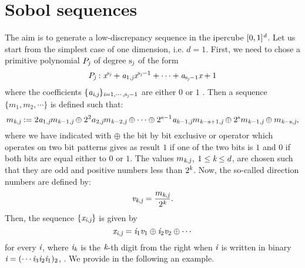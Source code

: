 \section{Sobol sequences}
The aim is to generate a low-discrepancy sequence in the ipercube $[0,1]^{\textit{d}}$. 
Let us start from the simplest case of one dimension, i.e. $d=1$. First, we need to chose a primitive polynomial $P_{\textit{j}}$ of degree $\textrm{s}_{\textit{j}}$ of the form
\begin{equation}
P_{\textit{j}}:\textit{x}^{\textrm{s}_{\textit{j}}}+\textit{a}_{1, \textit{j}}\textit{x}^{\textrm{s}_{\textit{j}}-1}+\cdots+\textit{a}_{\textrm{s}_{\textit{j}}-1}\textit{x}+1
\end{equation}
where the coefficients $\{\textit{a}_{\textit{i},\textit{j}}\}_{\textit{i}= 1, \cdots, \textrm{s}_{\textit{j}}-1}$ are either $0$ or $1$ \cite{joe2008constructing}. 
Then a sequence $\{m_1,m_2,\cdots\}$ is defined such that:
\begin{equation}\label{eq:m}
m_{\textit{k}, \textit{j}} := 2\textit{a}_{1, \textit{j}}m_{\textit{k}-1, \textit{j}}\oplus 2^2a_{2, \textit{j}}m_{\textit{k}-2, \textit{j}}\oplus \cdots \oplus 2^{\textrm{s}-1}\textit{a}_{\textit{k}-1, \textit{j}}m_{\textit{k}-\textrm{s}+1, \textit{j}}\oplus 2^{\textrm{s}}m_{\textit{k}-1, \textit{j}}\oplus m_{\textit{k}-\textrm{s}, \textit{j}},
\end{equation}
where we have indicated with $\oplus$ the bit by bit exclusive or operator which operates on two bit patterns gives as result $1$ if one of the two bits is $1$ and $0$ if both bits are equal either to $0$ or $1$. The values $m_{\textit{k}, \textit{j}}$, $1\leq\textit{k}\leq d$, are chosen such that they are odd and positive numbers less than $2^{\textit{k}}$. Now, the so-called direction numbers are defined by:
\begin{equation}\label{eq:dir_numb}
\textit{v}_{\textit{k}, \textit{j}}=\frac{m_{\textit{k}, \textit{j}}}{2^{\textit{k}}}.
\end{equation}
Then, the sequence $\{\textit{x}_{\textit{i}, \textit{j}}\}$ is given by
\begin{equation}\label{eq:x}
\textit{x}_{\textit{i}, \textit{j}} = \textit{i}_1\textit{v}_1\oplus \textit{i}_2\textit{v}_{2}\oplus \cdots
\end{equation}
for every $\textit{i}$, where $\textit{i}_{\textit{k}}$ is the $\textit{k}$-th digit from the right when $\textit{i}$ is written in binary $\textit{i} = (\cdots \textit{i}_3\textit{i}_2\textit{i}_1)_2$, \cite{joe2008notes}. We provide in the following an example. \\ \indent
